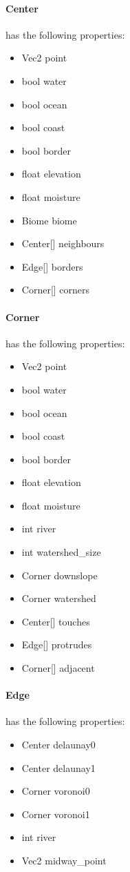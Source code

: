 \paragraph{Center} has the following properties:

\begin{itemize}
	\item Vec2 point
	\item bool water
	\item bool ocean
	\item bool coast
	\item bool border
	\item float elevation
	\item float moisture
	\item Biome biome
	\item Center[] neighbours
	\item Edge[] borders
	\item Corner[] corners
\end{itemize}

\paragraph{Corner} has the following properties:

\begin{itemize}
	\item Vec2 point
	\item bool water
	\item bool ocean
	\item bool coast
	\item bool border
	\item float elevation
	\item float moisture
	\item int river
	\item int watershed\_size
	\item Corner downslope
	\item Corner watershed
	\item Center[] touches
	\item Edge[] protrudes
	\item Corner[] adjacent
\end{itemize}

\paragraph{Edge} has the following properties:

\begin{itemize}
	\item Center delaunay0
	\item Center delaunay1
	\item Corner voronoi0
	\item Corner voronoi1
	\item int river
	\item Vec2 midway\_point
\end{itemize}
